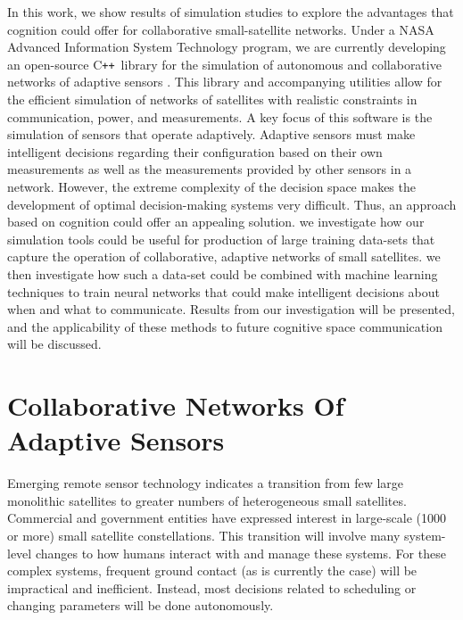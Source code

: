 \documentclass[conference]{IEEEtran}
\newcommand{\cpp}{C\texttt{++}~}
\begin{document}
In this work, we show results of simulation studies to explore the advantages that cognition could offer for collaborative small-satellite networks.  Under a NASA Advanced Information System Technology program, we are currently developing an open-source \cpp library for the simulation of autonomous and collaborative networks of adaptive sensors \cite{ref6}.  This library and accompanying utilities allow for the efficient simulation of networks of satellites with realistic constraints in communication, power, and measurements.  A key focus of this software is the simulation of sensors that operate adaptively.  Adaptive sensors must make intelligent decisions regarding their configuration based on their own measurements as well as the measurements provided by other sensors in a network.  However, the extreme complexity of the decision space makes the development of optimal decision-making systems very difficult.  Thus, an approach based on cognition could offer an appealing solution.  we investigate how our simulation tools could be useful for production of large training data-sets that capture the operation of collaborative, adaptive networks of small satellites.  we then investigate how such a data-set could be combined with machine learning techniques to train neural networks that could make intelligent decisions about when and what to communicate.  Results from our investigation will be presented, and the applicability of these methods to future cognitive space communication will be discussed.


\section{Collaborative Networks Of Adaptive Sensors}
\label{sec:overview}


Emerging remote sensor technology indicates a transition from few large monolithic satellites to greater numbers of heterogeneous small satellites.  Commercial and government entities have expressed interest in large-scale (1000 or more) small satellite constellations.  This transition will involve many system-level changes to how humans interact with and manage these systems.  For these complex systems, frequent ground contact (as is currently the case) will be impractical and inefficient.  Instead, most decisions related to scheduling or changing parameters will be done autonomously.
\end{document}

